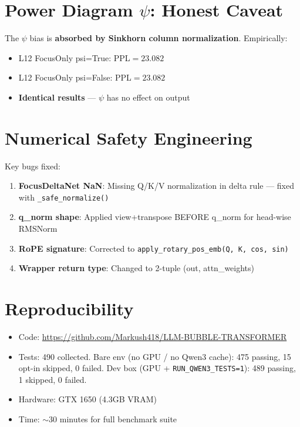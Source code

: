 \documentclass[11pt]{article}
\begin{document}
\section{Power Diagram $\psi$: Honest Caveat}

The $\psi$ bias is \textbf{absorbed by Sinkhorn column normalization}. Empirically:
\begin{itemize}
  \item L12 FocusOnly psi=True: PPL$=23.082$
  \item L12 FocusOnly psi=False: PPL$=23.082$
  \item \textbf{Identical results} --- $\psi$ has no effect on output
\end{itemize}

\section{Numerical Safety Engineering}

Key bugs fixed:
\begin{enumerate}
  \item \textbf{FocusDeltaNet NaN}: Missing Q/K/V normalization in delta rule --- fixed with \texttt{\_safe\_normalize()}
  \item \textbf{q\_norm shape}: Applied view+transpose BEFORE q\_norm for head-wise RMSNorm
  \item \textbf{RoPE signature}: Corrected to \texttt{apply\_rotary\_pos\_emb(Q, K, cos, sin)}
  \item \textbf{Wrapper return type}: Changed to 2-tuple (out, attn\_weights)
\end{enumerate}

\section{Reproducibility}

\begin{itemize}
  \item Code: \url{https://github.com/Markush418/LLM-BUBBLE-TRANSFORMER}
  \item Tests: 490 collected. Bare env (no GPU / no Qwen3 cache): 475 passing, 15 opt-in skipped, 0 failed. Dev box (GPU + \texttt{RUN\_QWEN3\_TESTS=1}): 489 passing, 1 skipped, 0 failed.
  \item Hardware: GTX 1650 (4.3GB VRAM)
  \item Time: $\sim$30 minutes for full benchmark suite
\end{itemize}
\end{document}
